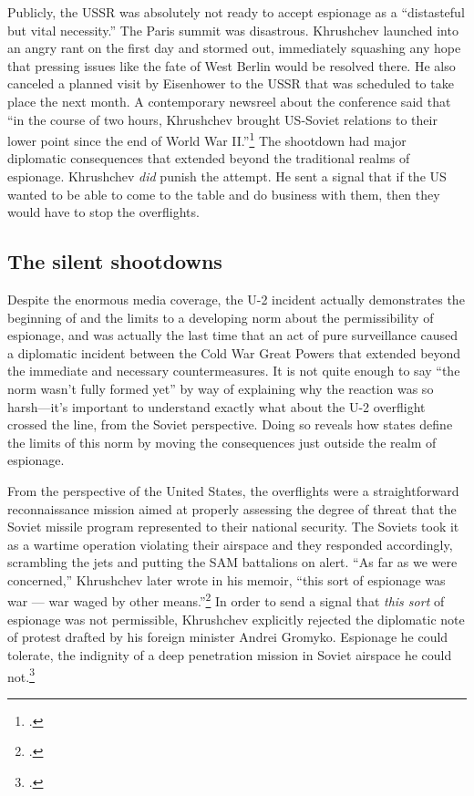 \documentclass[12pt]{article}
\begin{document}
Publicly, the USSR was absolutely not ready to accept espionage as a ``distasteful but vital necessity.'' The Paris summit was disastrous. Khrushchev launched into an angry rant on the first day and stormed out, immediately squashing any hope that pressing issues like the fate of West Berlin would be resolved there. He also canceled a planned visit by Eisenhower to the USSR that was scheduled to take place the next month. A contemporary newsreel about the conference said that ``in the course of two hours, Khrushchev brought US-Soviet relations to their lower point since the end of World War II.''\footcite{universal_studios_summit_1960} The shootdown had major diplomatic consequences that extended beyond the traditional realms of espionage. Khrushchev \emph{did} punish the attempt. He sent a signal that if the US wanted to be able to come to the table and do business with them, then they would have to stop the overflights.

\subsection{The silent shootdowns}
Despite the enormous media coverage, the U-2 incident actually demonstrates the beginning of and the limits to a developing norm about the permissibility of espionage, and was actually the last time that an act of pure surveillance caused a diplomatic incident between the Cold War Great Powers that extended beyond the immediate and necessary countermeasures. It is not quite enough to say ``the norm wasn't fully formed yet'' by way of explaining why the reaction was so harsh---it's important to understand exactly what about the U-2 overflight crossed the line, from the Soviet perspective. Doing so reveals how states define the limits of this norm by moving the consequences just outside the realm of espionage.

From the perspective of the United States, the overflights were a straightforward reconnaissance mission aimed at properly assessing the degree of threat that the Soviet missile program represented to their national security. The Soviets took it as a wartime operation violating their airspace and they responded accordingly, scrambling the jets and putting the SAM battalions on alert. ``As far as we were concerned,'' Khrushchev later wrote in his memoir, ``this sort of espionage was war --- war waged by other means.''\footcite[p.~446]{khrushchev_khrushchev_1974} In order to send a signal that \emph{this sort} of espionage was not permissible, Khrushchev explicitly rejected the diplomatic note of protest drafted by his foreign minister Andrei Gromyko. Espionage he could tolerate, the indignity of a deep penetration mission in Soviet airspace he could not.\footcite[p.~444]{khrushchev_khrushchev_1974}
\end{document}
